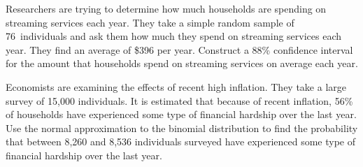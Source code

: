 \documentclass[11pt,letterpaper]{article}
\begin{document}

 Researchers are trying to determine how much households are spending on streaming services each year. They take a simple random sample of 76~individuals and ask them how much they spend on streaming services each year. They find an average of \$396 per year. Construct a 88\% confidence interval for the amount that households spend on streaming services on average each year. 



\newpage



 Economists are examining the effects of recent high inflation. They take a large survey of 15,000 individuals. It is estimated that because of recent inflation, 56\% of households have experienced some type of financial hardship over the last year. Use the normal approximation to the binomial distribution to find the probability that between 8,260 and 8,536 individuals surveyed have experienced some type of financial hardship over the last year. 
\end{document}
